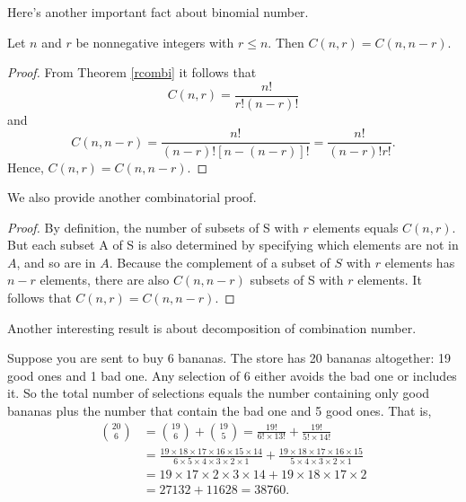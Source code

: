         Here's another important fact about binomial number.
        \begin{corollary}
            Let \( n \) and \( r \) be nonnegative integers with \( r \leq n \). Then \( C(n, r) = C(n, n - r) \).
        \end{corollary}
        \begin{proof}
            From Theorem \ref{rcombi} it follows that
            \[ C(n, r) = \frac{n!}{r!(n - r)!} \]
            and
            \[ C(n, n - r) = \frac{n!}{(n - r)![n - (n - r)]!} = \frac{n!}{(n - r)!r!}. \]
            Hence, \( C(n, r) = C(n, n - r) \).
            \end{proof}
        We also provide another combinatorial proof.
        \begin{proof}
        By definition, the number of subsets of S with $r$ elements equals $C(n,r)$. But each subset A of S is also determined by specifying which elements are not in $A$, and so are in $A$. Because the complement of a subset of $S$ with $r$ elements has $n-r$ elements, there are also $C(n,n-r)$ subsets of S with $r$ 
        elements. It follows that $C(n,r)=C(n,n-r).$
        \end{proof}
        Another interesting result is about decomposition of  combination number.
        \begin{example}
            Suppose you are sent to buy 6 bananas. The store has 20 bananas altogether: 19
            good ones and 1 bad one. Any selection of 6 either avoids the bad one or includes it.
            So the total number of selections equals the number containing only good bananas
            plus the number that contain the bad one and 5 good ones. That is,
            $$\begin{aligned}
                \binom{20}{6}& =\binom{19}6+\binom{19}5=\frac{19!}{6!\times13!}+\frac{19!}{5!\times14!} \\
                &=\frac{19\times18\times17\times16\times15\times14}{6\times5\times4\times3\times2\times1}+\frac{19\times18\times17\times16\times15}{5\times4\times3\times2\times1} \\
                &=19\times17\times2\times3\times14+19\times18\times17\times2 \\
                &=27 132+11 628=38 760.
            \end{aligned}$$
        \end{example}

